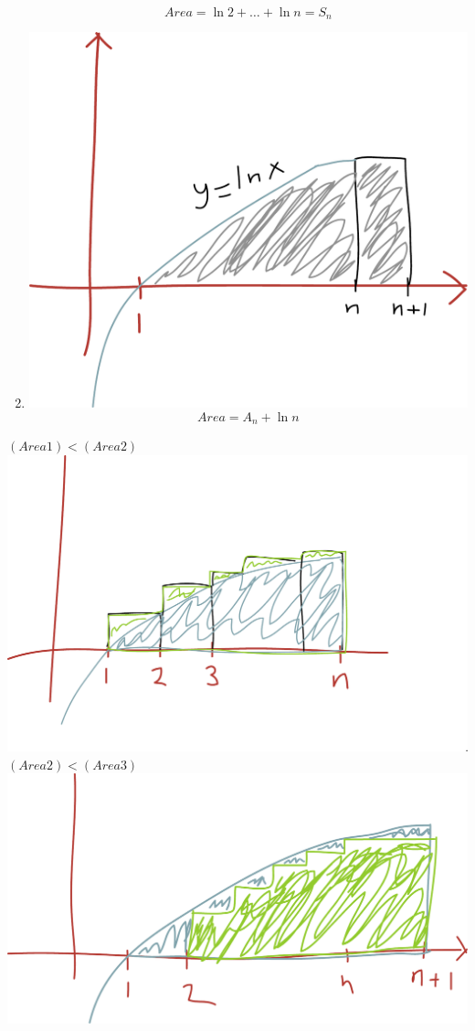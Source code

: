 \documentclass{article}
\begin{document}
\begin{enumerate}
    $$ Area = \ln 2 + \dots + \ln n = S_n $$
  \item
    \includegraphics[scale=0.25]{img/img7.pdf}\\
    $$ Area = A_n + \ln n $$
\end{enumerate}

$ (Area 1) < (Area 2) $\\
\includegraphics[scale=0.25]{img/img8.pdf}\\

$ (Area 2) < (Area 3) $\\
\includegraphics[scale=0.25]{img/img9.pdf}
\end{document}
